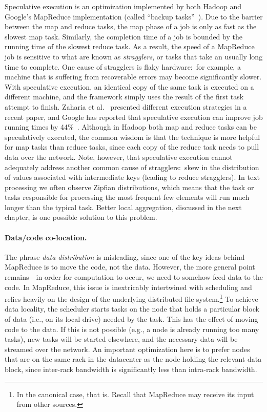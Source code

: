 \documentclass[11pt]{article}
\begin{document}
Speculative execution is an optimization implemented by both
Hadoop and Google's MapReduce implementation (called ``backup
tasks''~\cite{Dean_Ghemawat_OSDI2004}).  Due to the barrier between
the map and reduce tasks, the map phase of a job is only as fast as
the slowest map task.  Similarly, the completion time of a job is
bounded by the running time of the slowest reduce task.  As a result,
the speed of a MapReduce job is sensitive to what are known as \emph{
stragglers}, or tasks that take an usually long time to complete.  One
cause of stragglers is flaky hardware:\ for example, a machine that is
suffering from recoverable errors may become significantly slower.
With speculative execution, an identical copy of the same task is
executed on a different machine, and the framework simply uses the
result of the first task attempt to finish.  Zaharia et
al.~\cite{Zaharia_etal_OSDI2008} presented different execution
strategies in a recent paper, and Google has reported that speculative
execution can improve job running times by
44\%~\cite{Dean_Ghemawat_OSDI2004}.  Although in Hadoop both map and
reduce tasks can be speculatively executed, the common wisdom is that
the technique is more helpful for map tasks than reduce tasks, since
each copy of the reduce task needs to pull data over the network.
Note, however, that speculative execution cannot adequately address
another common cause of stragglers:\ skew in the distribution of
values associated with intermediate keys (leading to reduce
stragglers).  In text processing we often observe Zipfian
distributions, which means that the task or tasks responsible for
processing the most frequent few elements will run much longer than
the typical task.  Better local aggregation, discussed in the next
chapter, is one possible solution to this problem.

\paragraph{Data/code co-location.}  The phrase \emph{data
  distribution} is misleading, since one of the key ideas behind
MapReduce is to move the code, not the data.  However, the more
general point remains---in order for computation to occur, we need to
somehow feed data to the code.  In MapReduce, this issue is
inextricably intertwined with scheduling and relies heavily on the
design of the underlying distributed file system.\footnote{In the
canonical case, that is.  Recall that MapReduce may receive its input
from other sources.} To achieve data locality, the scheduler starts
tasks on the node that holds a particular block of data (i.e., on its
local drive) needed by the task.  This has the effect of moving code
to the data.  If this is not possible (e.g., a node is already running
too many tasks), new tasks will be started elsewhere, and the
necessary data will be streamed over the network.  An important
optimization here is to prefer nodes that are on the same rack in the
datacenter as the node holding the relevant data block, since
inter-rack bandwidth is significantly less than intra-rack bandwidth.
\end{document}
